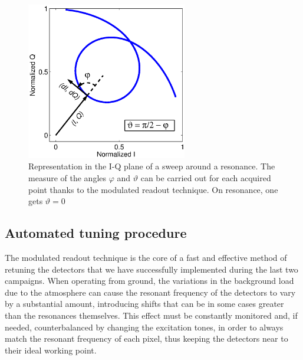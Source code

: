 \begin{figure}[t!]
\begin{center}
\includegraphics[bb = 132 256 450 568,width=7cm, clip]{figures/fig_resoCircle.eps}
\end{center}
  \caption{Representation in the I-Q plane of a sweep around a resonance. The measure of the angles $\varphi$ and $\vartheta$ can be carried out for each acquired point thanks to the modulated readout technique. On resonance, one gets $\vartheta = 0$}
\label{fig:angle}
\end{figure}


\subsection{Automated tuning procedure}
The modulated readout technique is the core of a fast and effective method of retuning the detectors that we have successfully implemented during the last two campaigns. When operating from ground, the variations in the background load due to the atmosphere can cause the resonant frequency of the detectors to vary by a substantial amount, introducing shifts that can be in some cases greater than the resonances themselves. This effect must be constantly monitored and, if needed, counterbalanced by changing the excitation tones, in order to always match the resonant frequency of each pixel, thus keeping the detectors near to their ideal working point.


